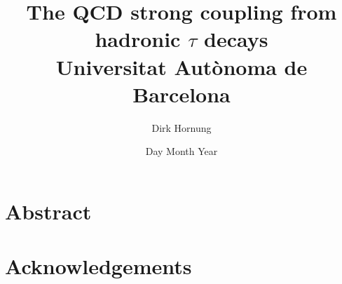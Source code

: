 \documentclass[12pt,a4paper]{report}
\makeatletter
\numberwithin{equation}{section}       %
\let\org@subfile
\renewcommand*{}[1]{%
  \filename@parse{#1}%
  \expandafter
  \graphicspath\expandafter{\expandafter{\filename@area}}%
  \org@subfile{#1}%
}
\makeatother
\begin{document}
  \title{
    {The \textsc{QCD} strong coupling from hadronic $\tau$ decays}\\
    {\large Universitat Autònoma de Barcelona}\\
  }
  \author{Dirk Hornung}
  \date{Day Month Year}
  \maketitle

  \newpage
  \chapter*{Abstract}


  \chapter*{Acknowledgements}

  
  
  
  
  
  

  \printbibliography
  \printnomenclature
\end{document}
